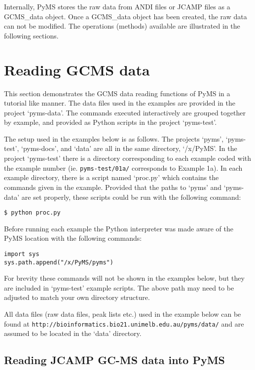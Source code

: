 Internally, PyMS stores the raw data from ANDI files or JCAMP files as a
GCMS\_data object. Once a GCMS\_data object has been created, the raw data can
not be modified. The operations (methods) available are illustrated in the
following sections.

\section{Reading GCMS data}

This section demonstrates the GCMS data reading functions of PyMS in a tutorial
like manner. The data files used in the examples are provided in the project
`pyms-data'. The commands executed interactively are grouped together by
example, and provided as Python scripts in the project `pyms-test'.

The setup used in the examples below is as follows. The projects `pyms',
`pyms-test', `pyms-docs', and `data' are all in the same directory,
`/x/PyMS'. In the project `pyms-test' there is a directory corresponding to
each example coded with the example number (ie. {\tt pyms-test/01a/}
corresponds to Example 1a). In each example directory, there is a script named
`proc.py' which contains the commands given in the example. Provided that the
paths to `pyms' and `pyms-data' are set properly, these scripts could be run
with the following command:

\begin{verbatim}
$ python proc.py
\end{verbatim}

Before running each example the Python interpreter was made aware of the
PyMS location with the following commands:

\begin{verbatim}
import sys
sys.path.append("/x/PyMS/pyms")
\end{verbatim}

For brevity these commands will not be shown in the examples below, but
they are included in `pyms-test' example scripts.  The above path may need
to be adjusted to match your own directory structure.

All data files (raw data files, peak lists etc.) used in the example below
can be found at {\tt http://bioinformatics.bio21.unimelb.edu.au/pyms/data/} and
are assumed to be located in the `data' directory.

\subsection{Reading JCAMP GC-MS data into PyMS}

